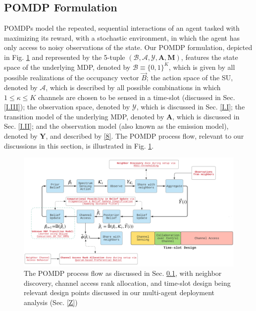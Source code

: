 \documentclass[12pt, draftcls, onecolumn]{IEEEtran}
\begin{document}
\subsection{POMDP Formulation}\label{II.0}
POMDPs model the repeated, sequential interactions of an agent tasked with maximizing its reward, with a stochastic environment, in which the agent has only access to noisy observations of the state. Our POMDP formulation, depicted in Fig. \ref{fig: A.add-1} and
represented by the 5-tuple $(\mathcal{B},\mathcal{A},\mathcal{Y},\mathbf{A},\mathbf{M})$, features the state space of the underlying MDP, denoted by $\mathcal{B}{\equiv}\{0,1\}^{K}$, which is given by all possible realizations of the occupancy vector $\vec{B}$; the action space of the SU, denoted by $\mathcal{A}$, which is described by all possible combinations in which $1{\leq}\kappa{\leq}K$ channels are chosen to be sensed in a time-slot (discussed in Sec. \ref{I.III}); the observation space, denoted by $\mathcal{Y}$, which is discussed in Sec. \ref{I.I}; the transition model of the underlying MDP, denoted by $\mathbf{A}$, which is discussed in Sec. \ref{I.II}; and the observation model (also known as the emission model), denoted by $\mathbf{Y}$, and described by \eqref{8}. The POMDP process flow, relevant to our discussions in this section, is illustrated in Fig. \ref{fig: A.add-1}.
\begin{figure} [t]
    \centerline{
    \includegraphics[width = 1.0\linewidth]{figures/POMDP_MultiAgent_Model.PNG}}
    \vspace{-6mm}
    \caption{The POMDP process flow as discussed in Sec. \ref{II.0}, with neighbor discovery, channel access rank allocation, and time-slot design being relevant design points discussed in our multi-agent deployment analysis (Sec. \ref{Z})}
    \vspace{-7mm}
    \label{fig: A.add-1}
\end{figure}
\end{document}
